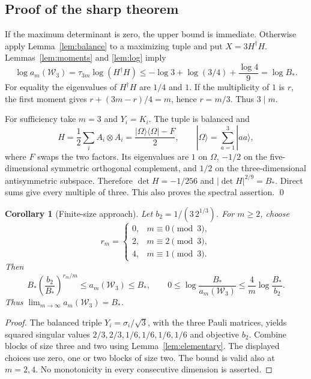 \documentclass[11pt,a4paper]{article}
\newtheorem{corollary}[theorem]{Corollary}
\theoremstyle{remark}\newtheorem{remark}[theorem]{Remark}
\newcommand{\W}{\mathcal W}
\begin{document}
\subsection{Proof of the sharp theorem}
If the maximum determinant is zero, the upper bound is immediate. Otherwise apply Lemma~\ref{lem:balance} to a maximizing tuple and put \(X=3H^\dagger H\). Lemmas~\ref{lem:moments} and \ref{lem:log} imply
\[
 \log a_m(\W_3)=\tau_{3m}\log(H^\dagger H)
 \le-\log3+\log(3/4)+\frac{\log4}{9}
 =\log B_*.
\]
For equality the eigenvalues of \(H^\dagger H\) are \(1/4\) and \(1\).
If the multiplicity of \(1\) is \(r\), the first moment gives
\(r+(3m-r)/4=m\), hence \(r=m/3\). Thus \(3\mid m\).

For sufficiency take \(m=3\) and \(Y_i=K_i\). The tuple is balanced and
\[
 H=\frac12\sum_i A_i\otimes A_i
   =\frac{|\Omega\rangle\langle\Omega|-F}{2},
 \qquad |\Omega\rangle=\sum_{a=1}^3|aa\rangle ,
\]
where \(F\) swaps the two factors. Its eigenvalues are \(1\) on \(\Omega\),
\(-1/2\) on the five-dimensional symmetric orthogonal complement, and \(1/2\) on the three-dimensional antisymmetric subspace. Therefore
\(\det H=-1/256\) and \(|\det H|^{2/9}=B_*\).
Direct sums give every multiple of three. This also proves the spectral assertion.
\qed

\begin{corollary}[Finite-size approach]\label{cor:rate}
Let \(b_2=1/(3\,2^{1/3})\). For \(m\ge2\), choose
\[
 r_m=\begin{cases}
 0,&m\equiv0\pmod3,\\
 2,&m\equiv2\pmod3,\\
 4,&m\equiv1\pmod3 .
 \end{cases}
\]
Then
\[
 B_*\left(\frac{b_2}{B_*}\right)^{r_m/m}
 \le a_m(\W_3)\le B_*,
 \qquad
 0\le\log\frac{B_*}{a_m(\W_3)}
 \le \frac4m\log\frac{B_*}{b_2}.
\]
Thus \(\lim_{m\to\infty}a_m(\W_3)=B_*\).
\end{corollary}
\begin{proof}
The balanced triple \(Y_i=\sigma_i/\sqrt3\), with the three Pauli matrices, yields squared singular values \(2/3,2/3,1/6,1/6,1/6,1/6\) and objective \(b_2\). Combine blocks of size three and two using Lemma~\ref{lem:elementary}. The displayed choices use zero, one or two blocks of size two. The bound is valid also at \(m=2,4\). No monotonicity in every consecutive dimension is asserted.
\end{proof}
\end{document}
